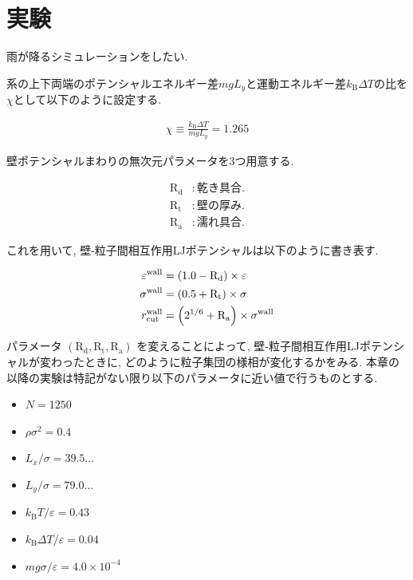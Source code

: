 \section{実験}

雨が降るシミュレーションをしたい.

系の上下両端のポテンシャルエネルギー差$mgL_y$と運動エネルギー差$k_{\text{B}}\Delta T$の比を$\chi$として以下のように設定する.

\begin{align}
  \chi \equiv \frac{k_{\text{B}}\Delta T}{mgL_{y}} = 1.265
\end{align}

壁ポテンシャルまわりの無次元パラメータを3つ用意する.

\begin{align}
  \text{R}_\text{d} &: 乾き具合. \\
  \text{R}_\text{t} &: 壁の厚み. \\
  \text{R}_\text{a} &: 濡れ具合.
\end{align}

これを用いて, 壁-粒子間相互作用LJポテンシャルは以下のように書き表す.

\begin{align}
  \varepsilon^{\text{wall}} &= \qty(1.0 - \text{R}_\text{d}) \times \varepsilon \\
  \sigma^{\text{wall}} &= \qty(0.5 + \text{R}_\text{t}) \times \sigma \\
  r^{\text{wall}}_{\text{cut}} &= \qty(2^{1/6} + \text{R}_\text{a}) \times \sigma^{\text{wall}}
\end{align}

パラメータ $(\text{R}_\text{d}, \text{R}_\text{t}, \text{R}_\text{a})$ を変えることによって, 壁-粒子間相互作用LJポテンシャルが変わったときに, どのように粒子集団の様相が変化するかをみる. 本章の以降の実験は特記がない限り以下のパラメータに近い値で行うものとする. 

\begin{itemize}
  \item $N = 1250$
  \item $\rho {\sigma}^2 = 0.4$
  \item $L_x / \sigma = 39.5\dots$
  \item $L_y / \sigma = 79.0\dots$
  \item $k_{\text{B}} T / \varepsilon = 0.43$
  \item $k_{\text{B}} \Delta T / \varepsilon = 0.04$
  \item $mg\sigma/\varepsilon = 4.0 \times 10^{-4}$
\end{itemize}


